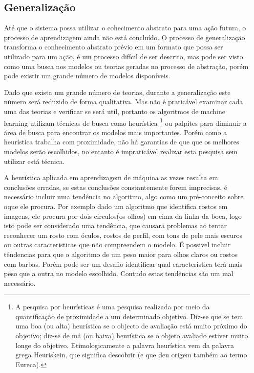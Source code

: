 \subsection{Generalização}
\label{cap:generalização-dados}

Até que o sistema possa utilizar o cohecimento abstrato para uma ação futura, o processo de aprendizagem ainda não está concluído.
O processo de generalização transforma o conhecimento abstrato prévio em um formato que possa ser utilizado para um ação, é um 
processo difícil de ser descrito, mas pode ser visto como uma busca nos modelos ou teorias geradas no processo de abstração, porém pode existir
um grande número de modelos disponíveis.

Dado que exista um grande número de teorias, durante a generalização este número será reduzido de forma qualitativa. 
Mas não é praticável examinar cada uma das teorias e verificar se será util, portanto os algoritmos de machine learning utilizam 
técnicas de busca como heurística \footnote{\cite{heuristica}A pesquisa por heurísticas é uma pesquisa realizada por meio da quantificação de proximidade a um determinado objetivo. 
Diz-se que se tem uma boa (ou alta) heurística se o objecto de avaliação está muito próximo do objetivo; diz-se de má (ou baixa) 
heurística se o objeto avaliado estiver muito longe do objetivo. Etimologicamente a palavra heurística vem da palavra grega Heuriskein, que significa descobrir (e que deu origem também ao termo Eureca).} 
ou palpites para diminuir a área de busca para encontrar os modelos mais importantes. Porém como a heurística trabalha com proximidade, 
não há garantias de que  que os melhores modelos serão escolhidos, no entanto é impraticável realizar esta pesquisa sem utilizar está técnica.

A heurística aplicada em aprendizagem de máquina as vezes resulta em conclusões erradas, se estas conclusões constantemente 
forem imprecisas, é necessário incluir uma tendência no algoritmo, algo como um pré-conceito sobre oque ele procura. Por exemplo 
dado um algoritmo que identifica rostos em imagens, ele procura por dois circulos(os olhos) em cima da linha da boca, logo isto 
pode ser considerado uma tendência, que causara problemas ao tentar reconhecer um rosto com óculos, rostos de perfil, com tons 
de pele mais escuros ou outras caracteristicas que não compreendem o modelo. É possivel incluir têndencias para que o algoritmo de 
um peso maior para olhos claros ou rostos com barbas. Porém pode ser um desafio identificar qual caracteristica terá mais peso que 
a outra no modelo escolhido. Contudo estas tendências são um mal necessário.

